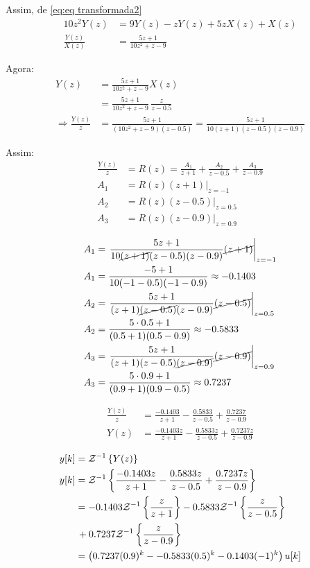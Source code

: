 \documentclass[12pt, a4paper]{article}
\begin{document}
Assim, de \eqref{eq:eq transformada2}
\begin{align}
	10z^2Y(z)&=9Y(z)-zY(z)+5zX(z)+X(z)\\
	\frac{Y(z)}{X(z)} &= \frac{5z+1}{10z^2+z-9}
\end{align}
\pagebreak


Agora:
\begin{align}
	Y(z) &= \frac{5z+1}{10z^2+z-9}X(z)\\
	&= \frac{5z+1}{10z^2+z-9}\,\frac{z}{z-0.5}\\
	\Rightarrow \frac{Y(z)}{z} &= \frac{5z+1}{(10z^2+z-9)(z-0.5)} = 
	\frac{5z+1}{10(z+1)(z-0.5)(z-0.9)} 
\end{align}

Assim:
\begin{align}
	\frac{Y(z)}{z} &= R(z)= \frac{A_1}{z+1}+\frac{A_2}{z-0.5}+\frac{A_3}{z-0.9}\\
	A_1 &= \left.R(z)(z+1)\right|_{z=-1}\\
	A_2 &= \left.R(z)(z-0.5)\right|_{z=0.5}\\
	A_3 &= \left.R(z)(z-0.9)\right|_{z=0.9}	
\end{align}

\begin{align}
	A_1 &= \left.\frac{5z+1}{10\cancel{(z+1)}(z-0.5)(z-0.9)}\cancel{(z+1)}\right|_{z=-1}\\
	A_1 &=\frac{-5+1}{10(-1-0.5)(-1-0.9)} \approx -0.1403\\
	A_2 &= \left.\frac{5z+1}{(z+1)\cancel{(z-0.5)}(z-0.9)}\cancel{(z-0.5)}\right|_{z=0.5}\\
	A_2 &=\frac{5\cdot 0.5+1}{(0.5+1)(0.5-0.9)} \approx -0.5833\\
	A_3 &= \left.\frac{5z+1}{(z+1)(z-0.5)\cancel{(z-0.9)}}\cancel{(z-0.9)}\right|_{z=0.9}\\
	A_3 &=\frac{5\cdot 0.9+1}{(0.9+1)(0.9-0.5)} \approx 0.7237
\end{align}
\pagebreak

\begin{align}
	\frac{Y(z)}{z} &= \frac{-0.1403}{z+1}-\frac{0.5833}{z-0.5}+\frac{0.7237}{z-0.9}\\
	Y(z) &= \frac{-0.1403z}{z+1}-\frac{0.5833z}{z-0.5}+\frac{0.7237z}{z-0.9}
\end{align}

\begin{align}
	y[k]&=\mathcal{Z}^{-1}\left\{Y(z)\right\}\\
	y[k]&=\mathcal{Z}^{-1}\left\{\frac{-0.1403z}{z+1}-\frac{0.5833z}{z-0.5}+\frac{0.7237z}{z-0.9}\right\}\\
	&= -0.1403\mathcal{Z}^{-1}\left\{\frac{z}{z+1}\right\}-0.5833\mathcal{Z}^{-1}\left\{\frac{z}{z-0.5}\right\}\nonumber\\&\,+0.7237\mathcal{Z}^{-1}\left\{\frac{z}{z-0.9}\right\}\\
	&= \left(0.7237(0.9)^k--0.5833(0.5)^k-0.1403(-1)^k\right)u[k]
\end{align}
\end{document}
